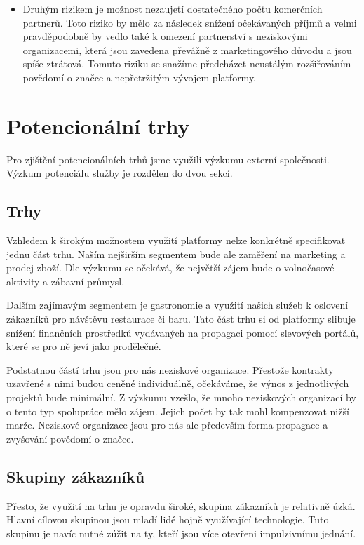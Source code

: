 \documentclass[12pt,czech]{article}
\begin{document}
\begin{description}
\begin{itemize}
        \item Druhým rizikem je možnost nezaujetí dostatečného počtu komerčních partnerů.
        Toto riziko by mělo za následek snížení očekávaných příjmů a velmi pravděpodobně by vedlo také k omezení partnerství s neziskovými organizacemi, která jsou zavedena převážně z marketingového důvodu a jsou spíše ztrátová.
        Tomuto riziku se snažíme předcházet neustálým rozšiřováním povědomí o značce a nepřetržitým vývojem platformy.
    \end{itemize}
\end{description}

\newpage
\section{Potencionální trhy}

Pro zjištění potencionálních trhů jsme využili výzkumu externí společnosti.
Výzkum potenciálu služby je rozdělen do dvou sekcí.

\subsection{Trhy}

Vzhledem k širokým možnostem využití platformy nelze konkrétně specifikovat jednu část trhu.
Naším nejširším segmentem bude ale zaměření na marketing a prodej zboží.
Dle výzkumu se očekává, že největší zájem bude o volnočasové aktivity a zábavní průmysl.

Dalším zajímavým segmentem je gastronomie a využití našich služeb k oslovení zákazníků pro návštěvu restaurace či baru.
Tato část trhu si od platformy slibuje snížení finančních prostředků vydávaných na propagaci pomocí slevových portálů, které se pro ně jeví jako prodělečné.

Podstatnou částí trhu jsou pro nás neziskové organizace.
Přestože kontrakty uzavřené s nimi budou ceněné individuálně, očekáváme, že výnos z jednotlivých projektů bude minimální.
Z výzkumu vzešlo, že mnoho neziskových organizací by o tento typ spolupráce mělo zájem.
Jejich počet by tak mohl kompenzovat nižší marže.
Neziskové organizace jsou pro nás ale především forma propagace a zvyšování povědomí o značce.

\subsection{Skupiny zákazníků}

Přesto, že využití na trhu je opravdu široké, skupina zákazníků je relativně úzká.
Hlavní cílovou skupinou jsou mladí lidé hojně využívající technologie.
Tuto skupinu je navíc nutné zúžit na ty, kteří jsou více otevřeni impulzivnímu jednání.
\end{document}
